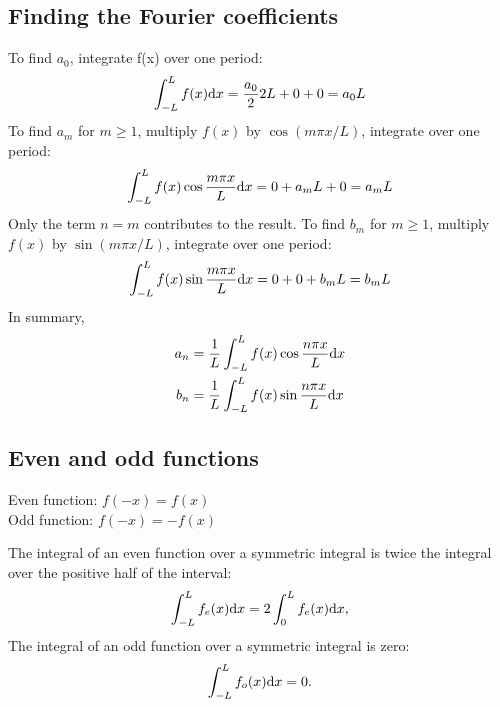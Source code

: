 \subsection*{Finding the Fourier coefficients}
To find $a_0$, integrate f(x) over one period:
\begin{equation*}
    \int_{-L}^{L}f(x) \differential x = \frac{a_0}{2}2L+0+0=a_0L
\end{equation*}
To find $a_m$ for $m \geq 1$, multiply $f(x)$ by $\cos(m \pi x / L)$, integrate over one period:
\begin{equation*}
    \int_{-L}^{L} f(x) \cos \frac{m\pi x}{L} \differential x = 0 + a_m L + 0 = a_m L
\end{equation*}
Only the term $n = m$ contributes to the result. To find $b_m$ for $m \geq 1$, multiply $f(x)$ by $\sin(m \pi x / L)$, integrate over one period:
\begin{equation*}
    \int_{-L}^{L} f(x) \sin \frac{m\pi x}{L} \differential x = 0 + 0 + b_m L = b_m L
\end{equation*}
In summary,
\begin{equation*}
    \begin{aligned}
        a_n &= \frac{1}{L} \int_{-L}^{L}f(x) \cos\frac{n \pi x}{L} \differential x \\
        b_n &= \frac{1}{L} \int_{-L}^{L}f(x) \sin\frac{n \pi x}{L} \differential x
    \end{aligned}
\end{equation*}

\subsection*{Even and odd functions}
Even function: $f(-x) = f(x)$ \\
Odd function: $f(-x) = -f(x)$
\vspace{\baselineskip}

The integral of an even function over a symmetric integral is twice the integral over the positive half of the interval:
\begin{equation*}
    \int_{-L}^{L} f_e(x) \differential x = 2 \int_{0}^{L} f_e(x) \differential x,
\end{equation*}
The integral of an odd function over a symmetric integral is zero:
\begin{equation*}
    \int_{-L}^{L} f_o(x) \differential x = 0.
\end{equation*}

